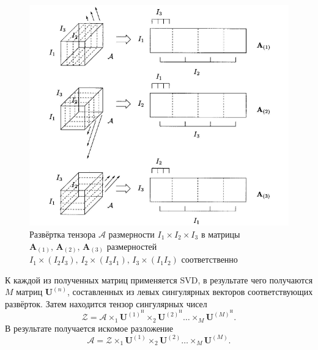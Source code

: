 \documentclass[specialist,
    substylefile = spbu_report.rtx,
    subf,href,colorlinks=true, 12pt]{disser}
\theoremstyle{plain}
\theoremstyle{definition}
\theoremstyle{remark}
\begin{document}
    \begin{figure}[!h]
        \centering
        \includegraphics[width=\textwidth]{unfolding}
        \caption{Развёртка тензора $\mathcal{A}$ размерности $I_1\times I_2 \times I_3$ в матрицы $\mathbf{A}_{(1)},\,
        \mathbf{A}_{(2)},\, \mathbf{A}_{(3)}$ размерностей $I_1\times (I_2 I_3),\, I_2\times (I_3 I_1),\, I_3\times (I_1 I_2)$
            соответственно}
        \label{fig:unfolding}
    \end{figure}

    К каждой из полученных матриц применяется SVD, в результате чего получаются $M$ матриц $\mathbf{U}^{(n)}$,
    составленных из левых сингулярных векторов соответствующих развёрток.
    Затем находится тензор сингулярных чисел
    \[\mathcal{Z}=\mathcal{A}\times_1 \mathbf{U}^{(1)^\mathrm{H}}\times_2 \mathbf{U}^{(2)^\mathrm{H}}\ldots \times_M
    \mathbf{U}^{(M)^\mathrm{H}}.\]
    В результате получается искомое разложение
    \[\mathcal{A} = \mathcal{Z}\times_1 \mathbf{U}^{(1)}\times_2 \mathbf{U}^{(2)}\ldots \times_M \mathbf{U}^{(M)}.\]
\end{document}
